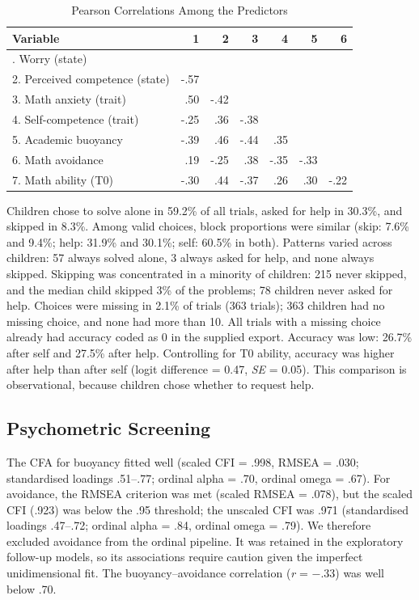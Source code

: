 \documentclass[
  man,
  floatsintext,
  longtable,
  nolmodern,
  notxfonts,
  notimes,
  colorlinks=true,linkcolor=blue,citecolor=blue,urlcolor=blue]{apa7}
\makeatletter
\renewenvironment{longtable}[1][]%
    {\par\vspace{24pt}\noindent\begin{tabular}}%
    {\bottomrule\end{tabular}\par\vspace{24pt}}%
\let\endhead\apa@gobblefoot}
\makeatother
\begin{document}
\begin{table}

{\caption{{Pearson Correlations Among the Predictors}{\label{tbl-cor}}}
\vspace{-20pt}}

\begin{longtable}[]{@{}lrrrrrr@{}}
\toprule\noalign{}
Variable & 1 & 2 & 3 & 4 & 5 & 6 \\
\midrule\noalign{}
\endhead
\bottomrule\noalign{}
\endlastfoot
1. Worry (state) & & & & & & \\
2. Perceived competence (state) & -.57 & & & & & \\
3. Math anxiety (trait) & .50 & -.42 & & & & \\
4. Self-competence (trait) & -.25 & .36 & -.38 & & & \\
5. Academic buoyancy & -.39 & .46 & -.44 & .35 & & \\
6. Math avoidance & .19 & -.25 & .38 & -.35 & -.33 & \\
7. Math ability (T0) & -.30 & .44 & -.37 & .26 & .30 & -.22 \\
\end{longtable}

\end{table}

Children chose to solve alone in 59.2\% of all trials, asked for help in
30.3\%, and skipped in 8.3\%. Among valid choices, block proportions
were similar (skip: 7.6\% and 9.4\%; help: 31.9\% and 30.1\%; self:
60.5\% in both). Patterns varied across children: 57 always solved
alone, 3 always asked for help, and none always skipped. Skipping was
concentrated in a minority of children: 215 never skipped, and the
median child skipped 3\% of the problems; 78 children never asked for
help. Choices were missing in 2.1\% of trials (363 trials); 363 children
had no missing choice, and none had more than 10. All trials with a
missing choice already had accuracy coded as 0 in the supplied export.
Accuracy was low: 26.7\% after self and 27.5\% after help. Controlling
for T0 ability, accuracy was higher after help than after self (logit
difference = 0.47, \emph{SE} = 0.05). This comparison is observational,
because children chose whether to request help.

\subsection{Psychometric Screening}\label{psychometric-screening-1}

The CFA for buoyancy fitted well (scaled CFI = .998, RMSEA = .030;
standardised loadings .51--.77; ordinal alpha = .70, ordinal omega =
.67). For avoidance, the RMSEA criterion was met (scaled RMSEA = .078),
but the scaled CFI (.923) was below the .95 threshold; the unscaled CFI
was .971 (standardised loadings .47--.72; ordinal alpha = .84, ordinal
omega = .79). We therefore excluded avoidance from the ordinal pipeline.
It was retained in the exploratory follow-up models, so its associations
require caution given the imperfect unidimensional fit. The
buoyancy--avoidance correlation (\emph{r} = −.33) was well below .70.
\end{document}
